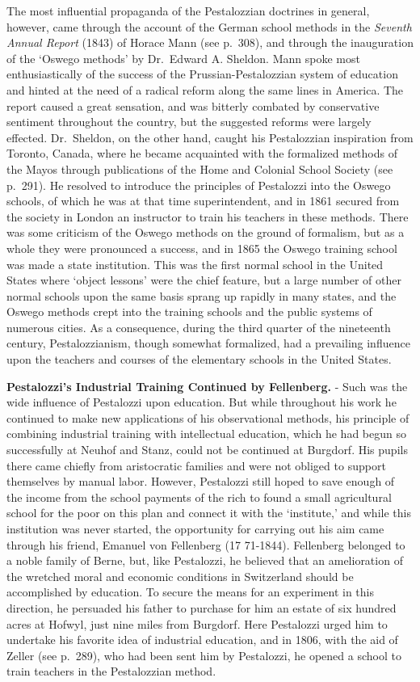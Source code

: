 \documentclass[
]{book}
\begin{document}
The most influential propaganda of the Pestalozzian doctrines in general, however, came through the account of the German school methods in the \emph{Seventh Annual Report} (1843) of Horace Mann (see p.~308), and through the inauguration of the `Oswego methods' by Dr.~Edward A. Sheldon. Mann spoke most enthusiastically of the success of the Prussian-Pestalozzian system of education and hinted at the need of a radical reform along the same lines in America. The report caused a great sensation, and was bitterly combated by conservative sentiment throughout the country, but the suggested reforms were largely effected. Dr.~Sheldon, on the other hand, caught his Pestalozzian inspiration from Toronto, Canada, where he became acquainted with the formalized methods of the Mayos through publications of the Home and Colonial School Society (see p.~291). He resolved to introduce the principles of Pestalozzi into the Oswego schools, of which he was at that time superintendent, and in 1861 secured from the society in London an instructor to train his teachers in these methods. There was some criticism of the Oswego methods on the ground of formalism, but as a whole they were pronounced a success, and in 1865 the Oswego training school was made a state institution. This was the first normal school in the United States where `object lessons' were the chief feature, but a large number of other normal schools upon the same basis sprang up rapidly in many states, and the Oswego methods crept into the training schools and the public systems of numerous cities. As a consequence, during the third quarter of the nineteenth century, Pestalozzianism, though somewhat formalized, had a prevailing influence upon the teachers and courses of the elementary schools in the United States.

\textbf{Pestalozzi's Industrial Training Continued by Fellenberg.} - Such was the wide influence of Pestalozzi upon education. But while throughout his work he continued to make new applications of his observational methods, his principle of combining industrial training with intellectual education, which he had begun so successfully at Neuhof and Stanz, could not be continued at Burgdorf. His pupils there came chiefly from aristocratic families and were not obliged to support themselves by manual labor. However, Pestalozzi still hoped to save enough of the income from the school payments of the rich to found a small agricultural school for the poor on this plan and connect it with the `institute,' and while this institution was never started, the opportunity for carrying out his aim came through his friend, Emanuel von Fellenberg (17 71-1844). Fellenberg belonged to a noble family of Berne, but, like Pestalozzi, he believed that an amelioration of the wretched moral and economic conditions in Switzerland should be accomplished by education. To secure the means for an experiment in this direction, he persuaded his father to purchase for him an estate of six hundred acres at Hofwyl, just nine miles from Burgdorf. Here Pestalozzi urged him to undertake his favorite idea of industrial education, and in 1806, with the aid of Zeller (see p.~289), who had been sent him by Pestalozzi, he opened a school to train teachers in the Pestalozzian method.
\end{document}
